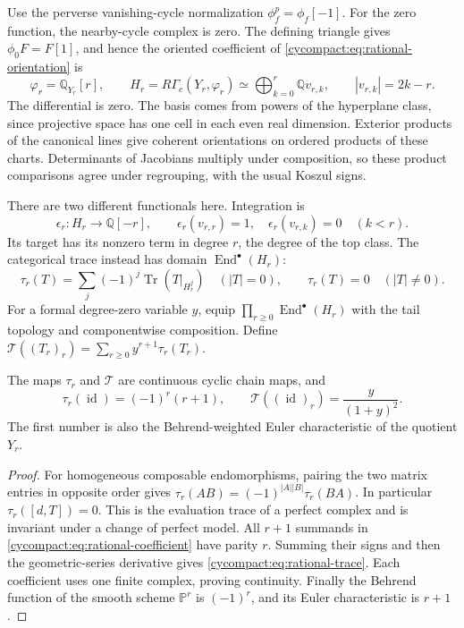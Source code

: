 Use the perverse vanishing-cycle normalization
$\phi_f^p=\phi_f[-1]$. For the zero function, the nearby-cycle
complex is zero. The defining triangle gives
$\phi_0F=F[1]$, and hence the oriented coefficient of
\eqref{cycompact:eq:rational-orientation} is
\begin{equation}\label{cycompact:eq:rational-coefficient}
 \varphi_r=\mathbb Q_{Y_r}[r],\qquad
 H_r=R\Gamma_c(Y_r,\varphi_r)
 \simeq\bigoplus_{k=0}^r\mathbb Qv_{r,k},
 \qquad |v_{r,k}|=2k-r.
\end{equation}
The differential is zero. The basis comes from powers of
the hyperplane class, since projective space has one cell
in each even real dimension. Exterior products of the
canonical lines give coherent orientations on ordered
products of these charts. Determinants of Jacobians
multiply under composition, so these product comparisons
agree under regrouping, with the usual Koszul signs.

There are two different functionals here. Integration is
\[
 \epsilon_r:H_r\longrightarrow\mathbb Q[-r],\qquad
 \epsilon_r(v_{r,r})=1,\quad
 \epsilon_r(v_{r,k})=0\quad(k<r).
\]
Its target has its nonzero term in degree $r$, the degree
of the top class. The categorical trace instead has domain
$\operatorname{End}^{\bullet}(H_r)$:
\[
 \tau_r(T)=\sum_j(-1)^j\operatorname{Tr}(T|_{H_r^j})
 \quad (|T|=0),\qquad \tau_r(T)=0\quad(|T|\ne0).
\]
For a formal degree-zero variable $y$, equip
$\prod_{r\geq0}\operatorname{End}^{\bullet}(H_r)$ with the
tail topology and componentwise composition. Define
$\mathcal T((T_r)_r)=\sum_{r\geq0}y^{r+1}\tau_r(T_r)$.

\begin{proposition}\label{cycompact:prop:rational-trace}
The maps $\tau_r$ and $\mathcal T$ are continuous cyclic chain maps, and
\begin{equation}\label{cycompact:eq:rational-trace}
 \tau_r(\operatorname{id})=(-1)^r(r+1),\qquad
 \mathcal T((\operatorname{id})_r)=\frac{y}{(1+y)^2}.
\end{equation}
The first number is also the Behrend-weighted Euler
characteristic of the quotient $Y_r$.
\end{proposition}

\begin{proof}
For homogeneous composable endomorphisms, pairing the two
matrix entries in opposite order gives
$\tau_r(AB)=(-1)^{|A||B|}\tau_r(BA)$.
In particular $\tau_r([d,T])=0$. This is the evaluation
trace of a perfect complex and is invariant under a change
of perfect model. All $r+1$ summands in
\eqref{cycompact:eq:rational-coefficient} have parity $r$.
Summing their signs and then the geometric-series derivative
gives \eqref{cycompact:eq:rational-trace}. Each coefficient
uses one finite complex, proving continuity. Finally the
Behrend function of the smooth scheme $\mathbb P^r$ is
$(-1)^r$, and its Euler characteristic is $r+1$.
\end{proof}

